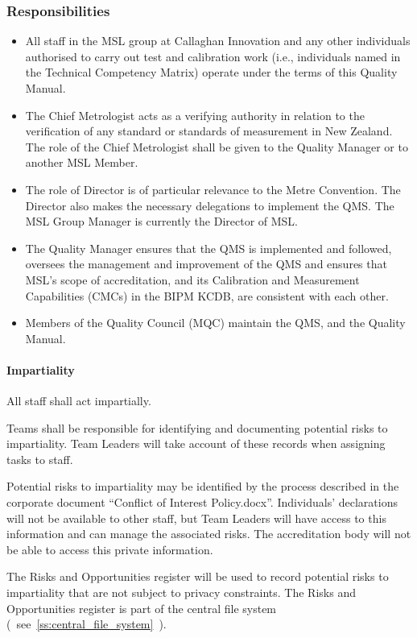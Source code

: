 \subsubsection{Responsibilities} 
\begin{itemize}
\item	All staff in the MSL group at Callaghan Innovation and any other individuals authorised to carry out test and calibration work (i.e., individuals named in the Technical Competency Matrix) operate under the terms of this Quality Manual.
\item	The Chief Metrologist acts as a verifying authority in relation to the verification of any standard or standards of measurement in New Zealand.  The role of the Chief Metrologist shall be given to the Quality Manager or to another MSL Member.  
\item	The role of Director is of particular relevance to the Metre Convention. The Director also makes the necessary delegations to implement the QMS. The MSL Group Manager is currently the Director of MSL. 
\item	The Quality Manager ensures that the QMS is implemented and followed, oversees the management and improvement of the QMS and ensures that MSL's scope of accreditation, and its Calibration and Measurement Capabilities (CMCs) in the BIPM KCDB, are 
consistent with each other.
\item	Members of the Quality Council (MQC) maintain the QMS, and the Quality Manual.

\end{itemize}

\paragraph{Impartiality}
\label{sssp:impartiality}
All staff shall act impartially.

Teams shall be responsible for identifying and documenting potential risks to impartiality. Team Leaders will take account of these records when assigning tasks to staff.

Potential risks to impartiality may be identified by the process described in the corporate document ``Conflict of Interest Policy.docx''. Individuals' declarations will not be available to other staff, but Team Leaders will have access to this information and can manage the associated risks. The accreditation body will not be able to access this private information. 

The Risks and Opportunities register will be used to record potential risks to impartiality that are not subject to privacy constraints. The Risks and Opportunities register is part of the central file system (~see~\ref{ss:central_file_system}~).

